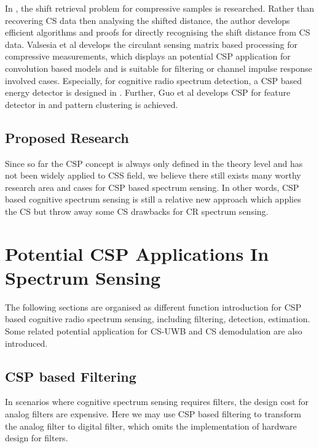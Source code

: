 In \cite{ohlsson2013compressive}, the shift retrieval problem for compressive samples is researched. Rather than recovering CS data then analysing the shifted distance, the author develops efficient algorithms and proofs for directly recognising the shift distance from CS data. Valsesia et al \cite{valsesia2014compressive} develops the circulant sensing matrix based processing for compressive measurements, which displays an potential CSP application for convolution based models and is suitable for filtering or channel impulse response involved cases. Especially, for cognitive radio spectrum detection, a CSP based energy detector is designed in \cite{appaiah2013spectrum}. Further, Guo et al develops CSP for feature detector in \cite{guo2013feature} and pattern clustering is achieved.

\subsection{Proposed Research}

Since so far the CSP concept is always only defined in the theory level and has not been widely applied to CSS field, we believe there still exists many worthy research area and cases for CSP based spectrum sensing. In other words, CSP based cognitive spectrum sensing is still a relative new approach which applies the CS but throw away some CS drawbacks for CR spectrum sensing. 

\section{Potential CSP Applications In Spectrum Sensing}

The following sections are organised as different function introduction for CSP based cognitive radio spectrum sensing, including filtering, detection, estimation. Some related potential application for CS-UWB and CS demodulation are also introduced.

\subsection{CSP based Filtering}\label{sct:csp_filter}

In scenarios where cognitive spectrum sensing requires filters, the design cost for analog filters are expensive. Here we may use CSP based filtering to transform the analog filter to digital filter, which omits the implementation of hardware design for filters.

